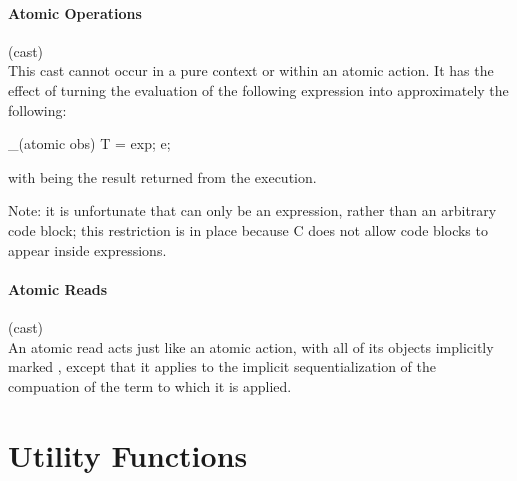 \documentclass[preprint,nocopyrightspace]{sigplanconf}
\newcommand{\subsubsubsection}[1]{\paragraph{#1}}
\begin{document}
{{{{\begin{VCC}
\subsubsubsection{Atomic Operations}

\noindent{} (cast)\\
This cast cannot occur in a pure context or within an atomic action.
It has the effect of turning the evaluation of the following
expression  into approximately the following:
\begin{VCC}
_(atomic obs) {
  T \result = exp;
  e;
}
\end{VCC}
with \vcc{\result} being the result returned from the execution. 

Note: it is unfortunate that  can only be an expression, rather
than an arbitrary code block; this restriction is in place because C
does not allow code blocks to appear inside expressions. 

\subsubsubsection{Atomic Reads}

 (cast)\\
An atomic read acts just like an atomic action, with all of its
objects implicitly marked , except that it applies
to the implicit sequentialization of the compuation of the term to
which it is applied.

\section{Utility Functions}


\end{VCC}}}}}
\end{document}
